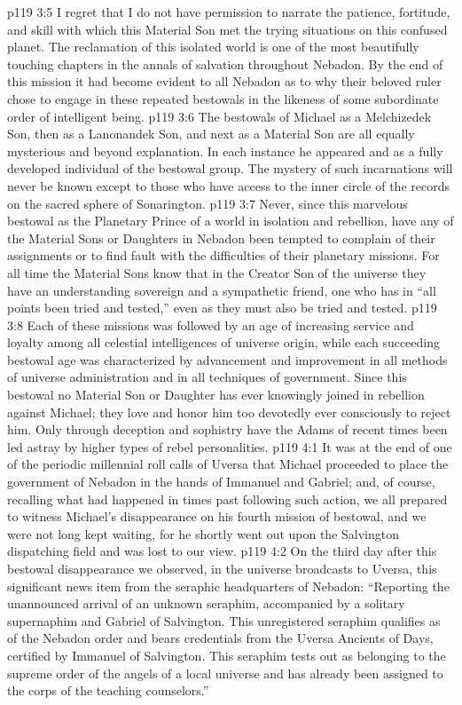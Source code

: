 \vs p119 3:5 I regret that I do not have permission to narrate the patience, fortitude, and skill with which this Material Son met the trying situations on this confused planet. The reclamation of this isolated world is one of the most beautifully touching chapters in the annals of salvation throughout Nebadon. By the end of this mission it had become evident to all Nebadon as to why their beloved ruler chose to engage in these repeated bestowals in the likeness of some subordinate order of intelligent being.
\pc \vs p119 3:6 The bestowals of Michael as a Melchizedek Son, then as a Lanonandek Son, and next as a Material Son are all equally mysterious and beyond explanation. In each instance he appeared  and as a fully developed individual of the bestowal group. The mystery of such incarnations will never be known except to those who have access to the inner circle of the records on the sacred sphere of Sonarington.
\pc \vs p119 3:7 Never, since this marvelous bestowal as the Planetary Prince of a world in isolation and rebellion, have any of the Material Sons or Daughters in Nebadon been tempted to complain of their assignments or to find fault with the difficulties of their planetary missions. For all time the Material Sons know that in the Creator Son of the universe they have an understanding sovereign and a sympathetic friend, one who has in “all points been tried and tested,” even as they must also be tried and tested.
\vs p119 3:8 Each of these missions was followed by an age of increasing service and loyalty among all celestial intelligences of universe origin, while each succeeding bestowal age was characterized by advancement and improvement in all methods of universe administration and in all techniques of government. Since this bestowal no Material Son or Daughter has ever knowingly joined in rebellion against Michael; they love and honor him too devotedly ever consciously to reject him. Only through deception and sophistry have the Adams of recent times been led astray by higher types of rebel personalities.
\vs p119 4:1 It was at the end of one of the periodic millennial roll calls of Uversa that Michael proceeded to place the government of Nebadon in the hands of Immanuel and Gabriel; and, of course, recalling what had happened in times past following such action, we all prepared to witness Michael’s disappearance on his fourth mission of bestowal, and we were not long kept waiting, for he shortly went out upon the Salvington dispatching field and was lost to our view.
\vs p119 4:2 On the third day after this bestowal disappearance we observed, in the universe broadcasts to Uversa, this significant news item from the seraphic headquarters of Nebadon: “Reporting the unannounced arrival of an unknown seraphim, accompanied by a solitary supernaphim and Gabriel of Salvington. This unregistered seraphim qualifies as of the Nebadon order and bears credentials from the Uversa Ancients of Days, certified by Immanuel of Salvington. This seraphim tests out as belonging to the supreme order of the angels of a local universe and has already been assigned to the corps of the teaching counselors.”
